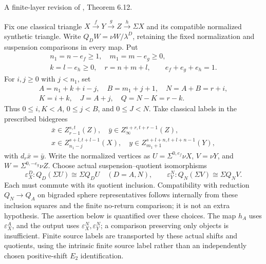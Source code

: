 \begin{theorem}
\label{paper:6.12}
A finite-layer revision of \cite{LWX126}, Theorem 6.12.\par
Fix one classical triangle $X\xrightarrow fY\xrightarrow gZ\xrightarrow h\Sigma X$ and its compatible normalized synthetic triangle. Write $Q_DW=\nu W/\lambda^D$, retaining the fixed normalization and suspension comparisons in every map. Put
\[
\begin{gathered}
n_1=n-e_f\geq1,\quad m_1=m-e_g\geq0,\\
k=l-e_h\geq0,\quad r=n+m+l,\qquad e_f+e_g+e_h=1.
\end{gathered}
\]
For $i,j\geq0$ with $j<n_1$, set
\[
\begin{gathered}
A=n_1+k+i-j,\quad B=m_1+j+1,\quad N=A+B=r+i,\\
K=i+k,\quad J=A+j,\quad Q=N-K=r-k.
\end{gathered}
\]
Thus $0\leq i,K<A$, $0\leq j<B$, and $0\leq J<N$. Take classical labels in the prescribed bidegrees
\[
\begin{gathered}
\bar x\in Z_{r-1}^{s,t}(Z),\quad \bar y\in Z_\infty^{s+r,t+r-1}(Z),\\
x\in Z_{n_1-j}^{s+l,t+l-1}(X),\quad y\in Z_{m_1+1}^{s+l+n,t+l+n-1}(Y),
\end{gathered}
\]
with $d_r\bar x=\bar y$. Write the normalized vertices as $U=\Sigma^{0,e_f}\nu X$, $V=\nu Y$, and $W=\Sigma^{0,-e_g}\nu Z$. Choose actual suspension--quotient isomorphisms
\[
\varepsilon_X^D:Q_D(\Sigma U)\cong\Sigma Q_DU\quad(D=A,N),\qquad
\varepsilon_Y^N:Q_N(\Sigma V)\cong\Sigma Q_NV.
\]
Each must commute with its quotient inclusion. Compatibility with reduction $Q_N\to Q_A$ on bigraded sphere representatives follows internally from these inclusion squares and the finite no-return comparison; it is not an extra hypothesis. The assertion below is quantified over these choices. The map $h_A$ uses $\varepsilon_X^A$, and the output uses $\varepsilon_X^N,\varepsilon_Y^N$; a comparison preserving only objects is insufficient. Finite source labels are transported by these actual shifts and quotients, using the intrinsic finite source label rather than an independently chosen positive-shift $E_2$ identification.


\end{theorem}
